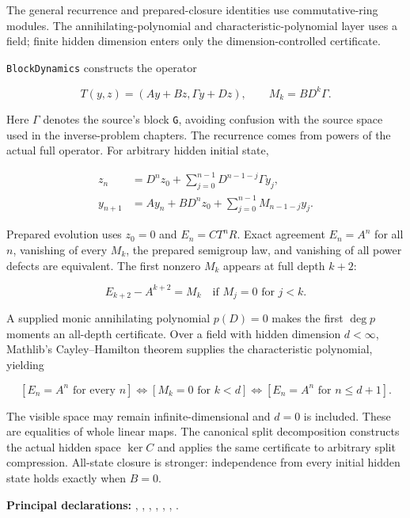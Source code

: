 \documentclass[11pt]{article}
\begin{document}
The general recurrence and prepared-closure identities use
commutative-ring modules. The annihilating-polynomial and
characteristic-polynomial layer uses a field; finite hidden dimension
enters only the dimension-controlled certificate.

\texttt{BlockDynamics} constructs the operator

\[
T(y,z)=(Ay+Bz,\Gamma y+Dz),\qquad M_k=BD^k\Gamma.
\]

Here \(\Gamma\) denotes the source's block \texttt{G},
avoiding confusion with the source space used in the inverse-problem
chapters. The recurrence comes from powers of the actual full operator.
For arbitrary hidden initial state,

\[
\begin{aligned}
z_n&=D^nz_0+\sum_{j=0}^{n-1}D^{n-1-j}\Gamma y_j,\\
y_{n+1}&=Ay_n+BD^nz_0+\sum_{j=0}^{n-1}M_{n-1-j}y_j.
\end{aligned}
\]

Prepared evolution uses \(z_0=0\) and \(E_n=CT^nR\). Exact agreement
\(E_n=A^n\) for all \(n\), vanishing of every \(M_k\), the prepared
semigroup law, and vanishing of all power defects are equivalent. The
first nonzero \(M_k\) appears at full depth \(k+2\):

\[
E_{k+2}-A^{k+2}=M_k\quad\text{if }M_j=0\text{ for }j<k.
\]

A supplied monic annihilating polynomial \(p(D)=0\) makes the first
\(\deg p\) moments an all-depth certificate. Over a field with hidden
dimension \(d<\infty\), Mathlib's Cayley--Hamilton theorem supplies the
characteristic polynomial, yielding

\[
[E_n=A^n\text{ for every }n]
\iff[M_k=0\text{ for }k<d]
\iff[E_n=A^n\text{ for }n\le d+1].
\]

The visible space may remain infinite-dimensional and \(d=0\) is
included. These are equalities of whole linear maps. The canonical split
decomposition constructs the actual hidden space \(\ker C\) and applies
the same certificate to arbitrary split compression. All-state closure
is stronger: independence from every initial hidden state holds exactly
when \(B=0\).

\textbf{Principal declarations:}
\texttt{},
\texttt{},
\texttt{},
\texttt{},
\texttt{},
\texttt{},
\texttt{}.
\end{document}
